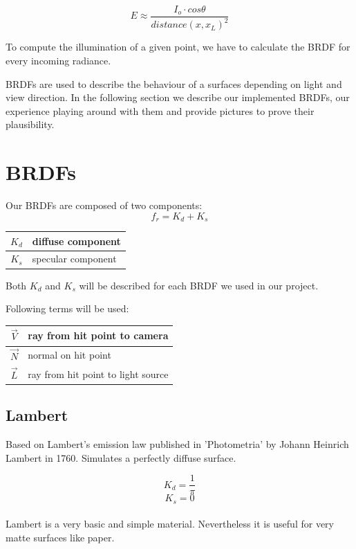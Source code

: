 \documentclass[11pt,a4paper]{article}
\begin{document}
\begin{equation}
E \approx \frac{I_o \cdot cos\theta}{distance(x,x_L)^2}
\end{equation}


To compute the illumination of a given point, we have to calculate the BRDF for every incoming radiance.

BRDFs are used to describe the behaviour of a surfaces depending on light and view direction.
In the following section we describe our implemented BRDFs, our experience playing around with them and provide pictures to prove their plausibility.


\newpage
\section{BRDFs}
Our BRDFs are composed of two components:
\begin{equation}
f_r = K_d + K_s
\end{equation}
\begin{table}[H]
\begin{tabular}{| c | l |}
\hline
$K_d$ & diffuse component\\ \hline
$K_s$ & specular component\\ \hline
\end{tabular}
\end{table}

Both $K_d$ and $K_s$ will be described for each BRDF we used in our project.

Following terms will be used:
\begin{table}[H]
\begin{tabular}{| c | l |}
\hline
$\vec{V}$ & ray from hit point to camera\\ \hline
$\vec{N}$ & normal on hit point\\ \hline
$\vec{L}$ & ray from hit point to light source\\ \hline
\end{tabular}
\end{table}



\subsection{Lambert}
Based on Lambert's emission law published in 'Photometria' by Johann Heinrich Lambert in 1760. Simulates a perfectly diffuse surface.

\begin{equation}
K_d = \frac{1}{\pi}
\end{equation}
\begin{equation}
K_s = 0
\end{equation}
\\Lambert is a very basic and simple material. Nevertheless it is useful for very matte surfaces like paper. 
\end{document}
